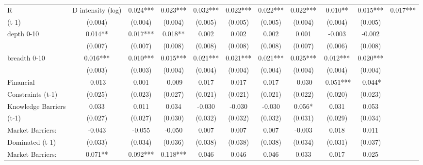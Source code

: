 \begin{table}[htbp]
\begin{tabular}{l*{9}{c}}
R&D intensity (log) &       0.024***&       0.023***&       0.032***&       0.022***&       0.022***&       0.022***&       0.010** &       0.015***&       0.017***\\
(t-1)               &     (0.004)   &     (0.004)   &     (0.004)   &     (0.005)   &     (0.005)   &     (0.005)   &     (0.004)   &     (0.004)   &     (0.005)   \\
depth 0-10          &       0.014** &       0.017***&       0.018** &       0.002   &       0.002   &       0.002   &       0.001   &      -0.003   &      -0.002   \\
                    &     (0.007)   &     (0.007)   &     (0.008)   &     (0.008)   &     (0.008)   &     (0.008)   &     (0.007)   &     (0.006)   &     (0.008)   \\
breadth 0-10        &       0.016***&       0.010***&       0.015***&       0.021***&       0.021***&       0.021***&       0.025***&       0.012***&       0.020***\\
                    &     (0.003)   &     (0.003)   &     (0.004)   &     (0.004)   &     (0.004)   &     (0.004)   &     (0.004)   &     (0.004)   &     (0.004)   \\
Financial           &      -0.013   &       0.001   &      -0.009   &       0.017   &       0.017   &       0.017   &      -0.030   &      -0.051***&      -0.044*  \\
Constraints (t-1)   &     (0.025)   &     (0.023)   &     (0.027)   &     (0.021)   &     (0.021)   &     (0.021)   &     (0.022)   &     (0.020)   &     (0.023)   \\
Knowledge Barriers  &       0.033   &       0.011   &       0.034   &      -0.030   &      -0.030   &      -0.030   &       0.056*  &       0.031   &       0.053   \\
(t-1)               &     (0.027)   &     (0.027)   &     (0.030)   &     (0.032)   &     (0.032)   &     (0.032)   &     (0.031)   &     (0.029)   &     (0.034)   \\
Market Barriers:    &      -0.043   &      -0.055   &      -0.050   &       0.007   &       0.007   &       0.007   &      -0.003   &       0.018   &       0.011   \\
Dominated (t-1)     &     (0.033)   &     (0.034)   &     (0.036)   &     (0.038)   &     (0.038)   &     (0.038)   &     (0.034)   &     (0.031)   &     (0.037)   \\
Market Barriers:    &       0.071** &       0.092***&       0.118***&       0.046   &       0.046   &       0.046   &       0.033   &       0.017   &       0.025   \\

\end{tabular}
\end{table}
